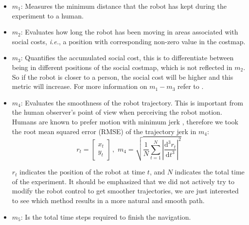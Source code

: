\begin{itemize}[ noitemsep, leftmargin=*]

\item $m_{1}$: Measures the minimum distance that the robot has kept during the experiment to a human.%


\item $m_{2}$: Evaluates how long the robot has been moving in areas associated with social costs, \textit{i.e.}, a position with corresponding non-zero value in the costmap.

\item $m_{3}$: Quantifies the accumulated social cost, this is to differentiate between being in different positions of the social costmap, which is not reflected in $m_{2}$. So if the robot is closer to a person, the social cost will be higher and this metric will increase. For more information on $m_{1}-m_{3}$ refer to \cite{talebpour2015board}. 

\item  $m_{4}$: Evaluates the smoothness of the robot trajectory. This is important from the human observer's point of view when perceiving the robot motion. Humans are known to prefer motion with minimum jerk \cite{sisbot2010synthesizing}, therefore we took the root mean squared error (RMSE) of the trajectory jerk in $m_{4}$:
\begin{equation}
r_{t} = \begin{bmatrix}
x_{t}\\
y_{t} 

\end{bmatrix} \, , \, \,  
m_{4} = \sqrt{\frac{1}{N} \sum_{t=1}^{N}\left | \frac{\mathrm{d^3} r_{t} }{\mathrm{d} t^3} \right |^{2}  }
\end{equation}


$r_{t}$ indicates the position of the robot at time $t$, and $N$ indicates the total time of the experiment. It should be emphasized that we did not actively try to modify the robot control to get smoother trajectories, we are just interested to see which method results in a more natural and smooth path.  

\item $m_{5}$: Is the total time steps required to finish the navigation.%



\end{itemize}


